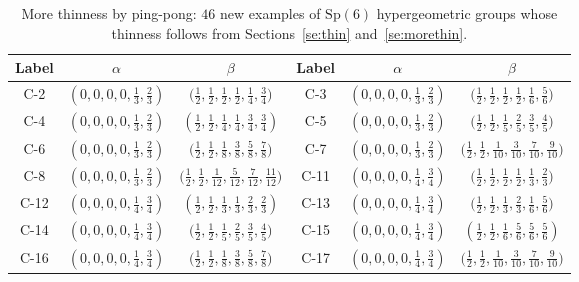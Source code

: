 \documentclass[11pt,a4paper]{amsart}
\theoremstyle{definition}
\theoremstyle{definition}
\numberwithin{equation}{section}
\newcommand{\Sp}{\mathrm{Sp}}
\begin{document}
{\centering
\scriptsize\renewcommand{\arraystretch}{2}
\begin{longtable}{|c|c|c|||c|c|c|}
\caption{More thinness by ping-pong: $46$ new examples of $\Sp(6)$ hypergeometric groups whose thinness follows from Sections~\ref{se:thin} and~\ref{se:morethin}.}\label{tab:thin-more}\\
\hline
 Label & $\alpha$ & $\beta$ & Label & $\alpha$ & $\beta$   \\                                                            
\hline
\hline
C-2 & $(0,0,0,0,\frac{1}{3},\frac{2}{3})$ &  $\big(\frac{1}{2},\frac{1}{2},\frac{1}{2},\frac{1}{2},\frac{1}{4},\frac{3}{4}\big)$ &  
C-3 & $(0,0,0,0,\frac{1}{3},\frac{2}{3})$ & $\big(\frac{1}{2},\frac{1}{2},\frac{1}{2},\frac{1}{2},\frac{1}{6},\frac{5}{6}\big)$  \\
\hline
C-4 & $\left(0,0,0,0,\frac{1}{3},\frac{2}{3}\right)$&$\left(\frac{1}{2},\frac{1}{2},\frac{1}{4},\frac{1}{4},\frac{3}{4},\frac{3}{4}\right)$ & 
C-5 & $(0,0,0,0,\frac{1}{3},\frac{2}{3})$ & $\big(\frac{1}{2},\frac{1}{2},\frac{1}{5},\frac{2}{5},\frac{3}{5},\frac{4}{5}\big)$ \\
\hline
C-6 & $(0,0,0,0,\frac{1}{3},\frac{2}{3})$ & $\big(\frac{1}{2},\frac{1}{2},\frac{1}{8},\frac{3}{8},\frac{5}{8},\frac{7}{8}\big)$ & 
C-7 & $(0,0,0,0,\frac{1}{3},\frac{2}{3})$&$\big(\frac{1}{2},\frac{1}{2},\frac{1}{10},\frac{3}{10},\frac{7}{10},\frac{9}{10}\big)$ \\
\hline
C-8 & $(0,0,0,0,\frac{1}{3},\frac{2}{3})$ & $\big(\frac{1}{2},\frac{1}{2},\frac{1}{12},\frac{5}{12},\frac{7}{12},\frac{11}{12}\big)$ & 
C-11 & $(0,0,0,0,\frac{1}{4},\frac{3}{4})$ & $\big(\frac{1}{2},\frac{1}{2},\frac{1}{2},\frac{1}{2},\frac{1}{3},\frac{2}{3}\big)$ \\
\hline
C-12 & $\left(0,0,0,0,\frac{1}{4},\frac{3}{4}\right)$ & $\left(\frac{1}{2},\frac{1}{2},\frac{1}{3},\frac{1}{3},\frac{2}{3},\frac{2}{3}\right)$ & 
C-13 & $(0,0,0,0,\frac{1}{4},\frac{3}{4})$ & $\big(\frac{1}{2},\frac{1}{2},\frac{1}{3},\frac{2}{3},\frac{1}{6},\frac{5}{6}\big)$  \\
\hline
C-14 & $(0,0,0,0,\frac{1}{4},\frac{3}{4})$ & $\big(\frac{1}{2},\frac{1}{2},\frac{1}{5},\frac{2}{5},\frac{3}{5},\frac{4}{5}\big)$ & 
C-15 & $\left(0,0,0,0,\frac{1}{4},\frac{3}{4}\right)$ & $\left(\frac{1}{2},\frac{1}{2},\frac{1}{6},\frac{5}{6},\frac{5}{6},\frac{5}{6}\right)$ \\
\hline
C-16 & $(0,0,0,0,\frac{1}{4},\frac{3}{4})$ & $\big(\frac{1}{2},\frac{1}{2},\frac{1}{8},\frac{3}{8},\frac{5}{8},\frac{7}{8}\big)$  & 
C-17 & $(0,0,0,0,\frac{1}{4},\frac{3}{4})$& $\big(\frac{1}{2},\frac{1}{2},\frac{1}{10},\frac{3}{10},\frac{7}{10},\frac{9}{10}\big)$ \\

\end{longtable}}
\end{document}

